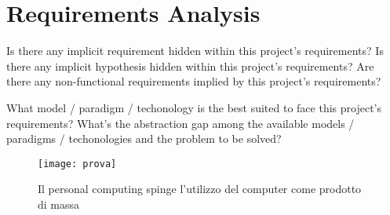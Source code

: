 \section{Requirements Analysis}

Is there any implicit requirement hidden within this project's requirements?
%
Is there any implicit hypothesis hidden within this project's requirements?
%
Are there any non-functional requirements implied by this project's requirements?

What model / paradigm / techonology is the best suited to face this project's requirements?
%
What's the abstraction gap among the available models / paradigms / techonologies and the problem to be solved?

\begin{figure}[H]
	\centering
	\texttt{[image: prova]}
	\caption{Il personal computing spinge l'utilizzo del computer come prodotto di massa}
	\label{fig:figure1}
\end{figure}